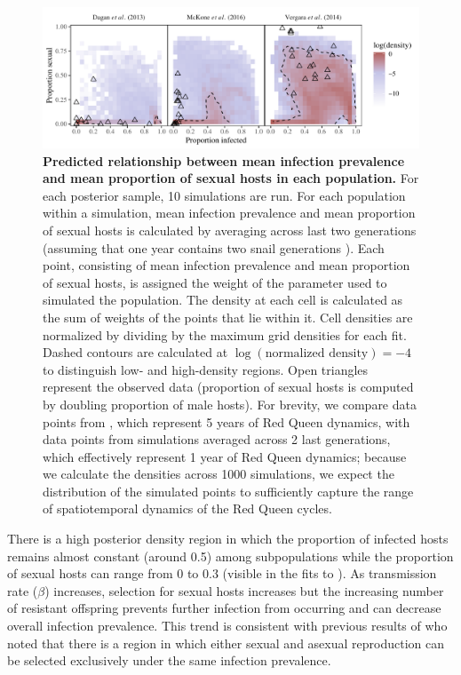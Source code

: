 \documentclass{article}\usepackage[]{graphicx}\usepackage[]{color}
\begin{document}
\begin{figure}[!ht]
\includegraphics[width=\textwidth]{../fig/simulated_data2.pdf}
\caption{{\bf Predicted relationship between mean infection prevalence and mean proportion of sexual hosts in each population.}
For each posterior sample, 10 simulations are run.
For each population within a simulation, mean infection prevalence and mean proportion of sexual hosts is calculated by averaging across last two generations (assuming that one year contains two snail generations \citep{neiman2005variation}).
Each point, consisting of mean infection prevalence and mean proportion of sexual hosts, is assigned the weight of the parameter used to simulated the population.
The density at each cell is calculated as the sum of weights of the points that lie within it.
Cell densities are normalized by dividing by the maximum grid densities for each fit.
Dashed contours are calculated at $\log(\textrm{normalized density}) = -4$ to distinguish low- and high-density regions.
Open triangles represent the observed data (proportion of sexual hosts is computed by doubling proportion of male hosts).
For brevity, we compare data points from \cite{vergara2014infection}, which represent 5 years of Red Queen dynamics, with data points from simulations averaged across 2 last generations, which effectively represent 1 year of Red Queen dynamics;
because we calculate the densities across 1000 simulations, we expect the distribution of the simulated points to sufficiently capture the range of spatiotemporal dynamics of the Red Queen cycles.
}
\label{fig:ivs}
\end{figure}

There is a high posterior density region in which the proportion of infected hosts remains almost constant (around 0.5) among subpopulations while the proportion of sexual hosts can range from 0 to 0.3 (visible in the fits to \cite{mckone2016fine}).
As transmission rate ($\beta$) increases, selection for sexual hosts increases but the increasing number of resistant offspring prevents further infection from occurring and can decrease overall infection prevalence.
This trend is consistent with previous results of \cite{lively2001trematode} who noted that there is a region in which either sexual and asexual reproduction can be selected exclusively under the same infection prevalence.
\end{document}
